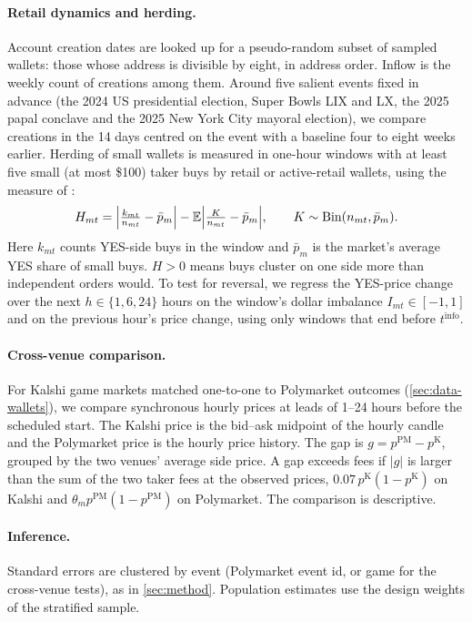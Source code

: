 \paragraph{Retail dynamics and herding.}
Account creation dates are looked up for a pseudo-random subset of sampled wallets: those whose address is
divisible by eight, in address order. Inflow is the weekly count of creations among them. Around five salient events
fixed in advance (the 2024 US presidential election, Super Bowls LIX and LX, the 2025 papal
conclave and the 2025 New York City mayoral election), we compare creations in the 14 days centred
on the event with a baseline four to eight weeks earlier. Herding of small wallets is measured in
one-hour windows with at least five small (at most \$100) taker buys by retail or active-retail
wallets, using the measure of
\citet{lakonishok1992}:
\begin{equation}\label{eq:wallets-lsv}
  H_{mt}=\Bigl|\tfrac{k_{mt}}{n_{mt}}-\bar p_m\Bigr|-\mathbb{E}\Bigl|\tfrac{K}{n_{mt}}-\bar p_m\Bigr|,\qquad K\sim\mathrm{Bin}(n_{mt},\bar p_m).
\end{equation}
Here $k_{mt}$ counts YES-side buys in the window and $\bar p_m$ is the market's average YES share of
small buys. $H>0$ means buys cluster on one side more than independent orders would. To test for
reversal, we regress the YES-price change over the next $h\in\{1,6,24\}$ hours on the window's
dollar imbalance $I_{mt}\in[-1,1]$ and on the previous hour's price change, using only windows that
end before $t^{\mathrm{info}}$.

\paragraph{Cross-venue comparison.}
For Kalshi game markets matched one-to-one to Polymarket outcomes (\cref{sec:data-wallets}), we
compare synchronous hourly prices at leads of 1--24 hours before the scheduled start. The Kalshi
price is the bid--ask midpoint of the hourly candle and the Polymarket price is the hourly price
history. The gap is $g=p^{\mathrm{PM}}-p^{\mathrm{K}}$, grouped by the two venues' average side
price. A gap exceeds fees if $|g|$ is larger than the sum of the two taker fees at the observed
prices, $0.07\,p^{\mathrm{K}}(1-p^{\mathrm{K}})$ on Kalshi and $\theta_m p^{\mathrm{PM}}(1-p^{\mathrm{PM}})$
on Polymarket. The comparison is descriptive.

\paragraph{Inference.}
Standard errors are clustered by event (Polymarket event id, or game for the cross-venue tests), as
in \cref{sec:method}. Population estimates use the design weights of the stratified sample.
